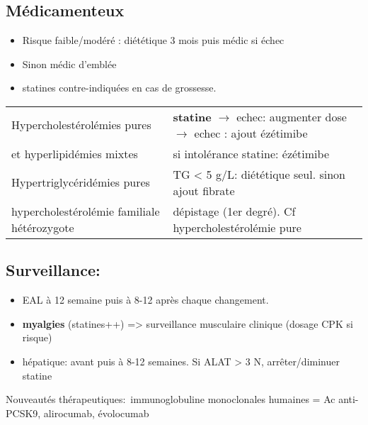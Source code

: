 \documentclass[11pt]{article}
\begin{document}
\subsection{Médicamenteux}
\label{sec:org8fdc33c}
\begin{itemize}
\item Risque faible/modéré : diététique 3 mois puis médic si échec
\item Sinon médic d'emblée
\item statines contre-indiquées en cas de grossesse.
\end{itemize}

\begin{center}
\begin{tabular}{ll}
Hypercholestérolémies pures & \textbf{statine} \(\rightarrow\) echec: augmenter dose \(\rightarrow\) echec : ajout ézétimibe\\
et hyperlipidémies mixtes & si intolérance statine: ézétimibe\\
\hline
Hypertriglycéridémies pures & TG < 5 g/L:  diététique seul. sinon ajout fibrate\\
\hline
hypercholestérolémie familiale hétérozygote & dépistage (1er degré). Cf hypercholestérolémie pure\\
\end{tabular}
\end{center}


\subsection{Surveillance:}
\label{sec:org504fa77}
\begin{itemize}
\item EAL à 12 semaine puis à 8-12 après chaque changement.
\item \textbf{myalgies} (statines++) => surveillance musculaire clinique (dosage CPK si risque)
\item hépatique: avant puis à 8-12 semaines. Si ALAT >  3 N, arrêter/diminuer statine
\end{itemize}

Nouveautés thérapeutiques: immunoglobuline monoclonales humaines = Ac anti-PCSK9, alirocumab, évolocumab
\end{document}
